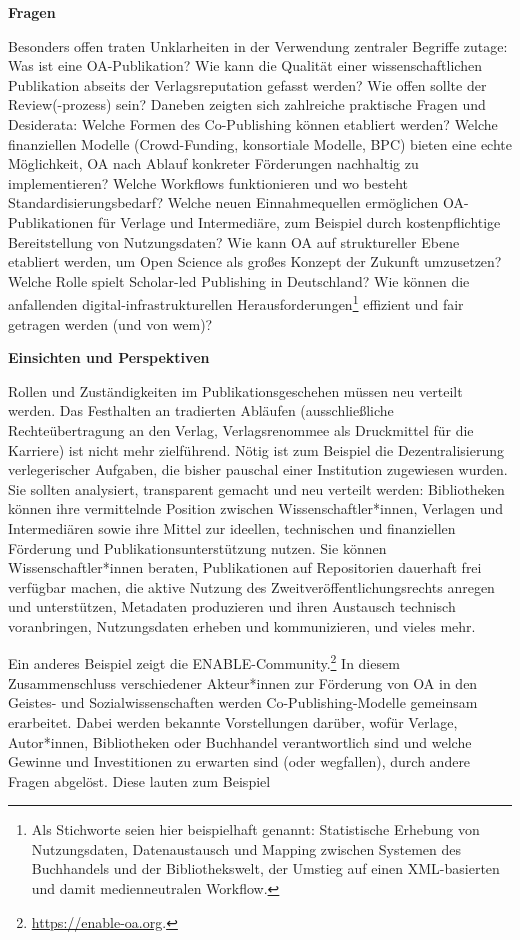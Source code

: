 \documentclass[a4paper,
fontsize=11pt,
oneside,
numbers=noperiodatend,
parskip=half-,
bibliography=totoc,
final
]{scrartcl}
\begin{document}
\textbf{Fragen}

Besonders offen traten Unklarheiten in der Verwendung zentraler Begriffe
zutage: Was ist eine OA-Publikation? Wie kann die Qualität einer
wissenschaftlichen Publikation abseits der Verlagsreputation gefasst
werden? Wie offen sollte der Review(-prozess) sein? Daneben zeigten sich
zahlreiche praktische Fragen und Desiderata: Welche Formen des
Co-Publishing können etabliert werden? Welche finanziellen Modelle
(Crowd-Funding, konsortiale Modelle, BPC) bieten eine echte Möglichkeit,
OA nach Ablauf konkreter Förderungen nachhaltig zu implementieren?
Welche Workflows funktionieren und wo besteht Standardisierungsbedarf?
Welche neuen Einnahmequellen ermöglichen OA-Publikationen für Verlage
und Intermediäre, zum Beispiel durch kostenpflichtige Bereitstellung von
Nutzungsdaten? Wie kann OA auf struktureller Ebene etabliert werden, um
Open Science als großes Konzept der Zukunft umzusetzen? Welche Rolle
spielt Scholar-led Publishing in Deutschland? Wie können die anfallenden
digital-infrastrukturellen Herausforderungen\footnote{Als Stichworte
  seien hier beispielhaft genannt: Statistische Erhebung von
  Nutzungsdaten, Datenaustausch und Mapping zwischen Systemen des
  Buchhandels und der Bibliothekswelt, der Umstieg auf einen
  XML-basierten und damit medienneutralen Workflow.} effizient und fair
getragen werden (und von wem)?

\textbf{Einsichten und Perspektiven}

Rollen und Zuständigkeiten im Publikationsgeschehen müssen neu verteilt
werden. Das Festhalten an tradierten Abläufen (ausschließliche
Rechteübertragung an den Verlag, Verlagsrenommee als Druckmittel für die
Karriere) ist nicht mehr zielführend. Nötig ist zum Beispiel die
Dezentralisierung verlegerischer Aufgaben, die bisher pauschal einer
Institution zugewiesen wurden. Sie sollten analysiert, transparent
gemacht und neu verteilt werden: Bibliotheken können ihre vermittelnde
Position zwischen Wissenschaftler*innen, Verlagen und Intermediären
sowie ihre Mittel zur ideellen, technischen und finanziellen Förderung
und Publikationsunterstützung nutzen. Sie können Wissenschaftler*innen
beraten, Publikationen auf Repositorien dauerhaft frei verfügbar machen,
die aktive Nutzung des Zweitveröffentlichungsrechts anregen und
unterstützen, Metadaten produzieren und ihren Austausch technisch
voranbringen, Nutzungsdaten erheben und kommunizieren, und vieles mehr.

Ein anderes Beispiel zeigt die ENABLE-Community.\footnote{\url{https://enable-oa.org}.}
In diesem Zusammenschluss verschiedener Akteur*innen zur Förderung von
OA in den Geistes- und Sozialwissenschaften werden Co-Publishing-Modelle
gemeinsam erarbeitet. Dabei werden bekannte Vorstellungen darüber, wofür
Verlage, Autor*innen, Bibliotheken oder Buchhandel verantwortlich sind
und welche Gewinne und Investitionen zu erwarten sind (oder wegfallen),
durch andere Fragen abgelöst. Diese lauten zum Beispiel
\end{document}
